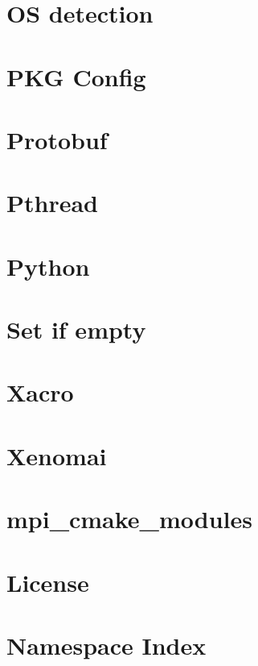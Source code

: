 \documentclass[twoside]{book}
\newcommand{\+}{\discretionary{\mbox{\scriptsize$\hookleftarrow$}}{}{}}
\begin{document}
\chapter{OS detection}
\label{md_doc_os_detection}

\chapter{P\+KG Config}
\label{md_doc_pkg_config}

\chapter{Protobuf}
\label{md_doc_protobuf}

\chapter{Pthread}
\label{md_doc_pthread}

\chapter{Python}
\label{md_doc_python}

\chapter{Set if empty}
\label{md_doc_set_if_empty}

\chapter{Xacro}
\label{md_doc_xacro}

\chapter{Xenomai}
\label{md_doc_xenomai}

\chapter{mpi\+\_\+cmake\+\_\+modules}
\label{md_readme}

\chapter{License}
\label{license}

\chapter{Namespace Index}

\end{document}
